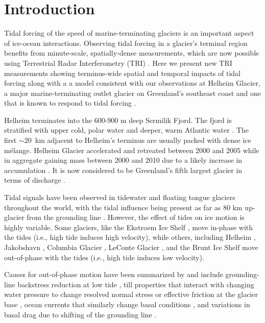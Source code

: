 \section{Introduction}

Tidal forcing of the speed of marine-terminating glaciers is an important aspect of ice-ocean interactions.
 Observing tidal forcing in a glacier's terminal region benefits from minute-scale, spatially-dense measurements, which are now possible using Terrestrial Radar Interferometry (TRI) \citep{rolstad2009ground,dixon2012emerging}. Here we present new TRI measurements showing terminus-wide spatial and temporal impacts of tidal forcing along with a a model consistent with our observations at Helheim Glacier,  a major marine-terminating outlet glacier on Greenland's southeast coast and one that is known to respond to tidal forcing \citep{de2010sudden}. 

	
Helheim terminates into the 600-900 m deep Sermilik Fjord. The fjord is stratified with upper cold, polar water and deeper, warm Atlantic water \citep{andresen2012rapid,straneo2012characteristics,straneo2013challenges}. The first $\sim$20~km adjacent to Helheim's terminus are usually packed with dense ice m\'elange. Helheim Glacier accelerated and retreated between 2000 and 2005 \citep{howat2005rapid,rignot2006changes} while in aggregate gaining mass between 2000 and 2010 due to a likely increase in accumulation \citep{howat2011mass}. It is now considered to be  Greenland's fifth largest glacier in terms of discharge \citep{enderlin2014improved}.
	
	
Tidal signals have been observed in tidewater and floating tongue glaciers throughout the world, with the tidal influence being present as far as 80 km up-glacier from the grounding line \citep{anandakrishnan2003ice}.  However, the effect of tides on ice motion is highly variable. Some glaciers, like the Ekstroem Ice Shelf \citep{heinert2007parametric}, move in-phase with the tides (i.e., high tide induces high velocity), while others, including Helheim \citep{de2010sudden}, Jakobshavn \citep{podrasky2014quantifying}, Columbia Glacier \citep{meier1987fast,walters1987analysis}, LeConte Glacier \citep{oneel2001leconte}, and the Brunt Ice Shelf \citep{doake2002tide} move out-of-phase with the tides (i.e., high tide induces low velocity). 


Causes for out-of-phase motion have been summarized by \citet{murray2007ice} and include grounding-line backstress reduction at low tide \citep{thomas2007tide}, till properties that interact with changing water pressure to change resolved normal stress or effective friction at the glacier base \citep{gudmundsson2005long}, ocean currents that similarly change basal conditions \citep{doake2002tide}, and variations in basal drag due to shifting of the grounding line \citep{heinert2007parametric,sayag2013elastic}.

